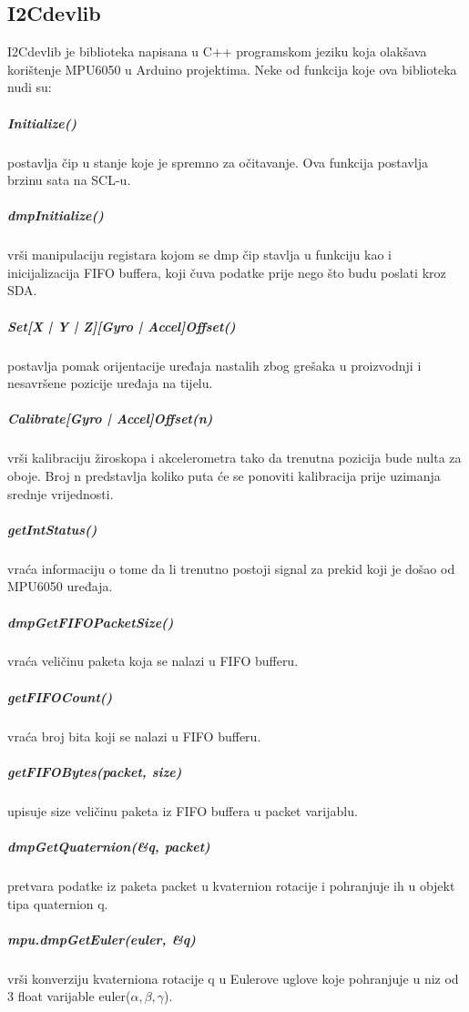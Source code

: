 \documentclass[../Document.tex]{subfiles}
\begin{document}

\subsection{I2Cdevlib} \label{itclib}
I2Cdevlib je biblioteka napisana u C++ programskom jeziku koja olakšava korištenje MPU6050 u Arduino projektima. Neke od funkcija koje ova biblioteka nudi su:

\subparagraph{Initialize()} \noindent postavlja čip u stanje koje je spremno za očitavanje. Ova funkcija postavlja brzinu sata na SCL-u.

\subparagraph{dmpInitialize()} \noindent vrši manipulaciju registara kojom se dmp čip stavlja u funkciju kao i inicijalizacija FIFO buffera, koji čuva podatke prije nego što budu poslati kroz SDA.

\subparagraph{Set[X | Y | Z][Gyro | Accel]Offset()} \noindent postavlja pomak orijentacije uređaja nastalih zbog grešaka u proizvodnji i nesavršene pozicije uređaja na tijelu.

\subparagraph{Calibrate[Gyro | Accel]Offset(n)} \noindent vrši kalibraciju žiroskopa i akcelerometra tako da trenutna pozicija bude nulta za oboje. Broj n predstavlja koliko puta će se ponoviti kalibracija prije uzimanja srednje vrijednosti.

\subparagraph{getIntStatus()} \noindent vraća informaciju o tome da li trenutno postoji signal za prekid koji je došao od MPU6050 uređaja.

\subparagraph{dmpGetFIFOPacketSize()} \noindent vraća veličinu paketa koja se nalazi u FIFO bufferu.

\subparagraph{getFIFOCount()} \noindent vraća broj bita koji se nalazi u FIFO bufferu.

\subparagraph{getFIFOBytes(packet, size)} \noindent upisuje size veličinu paketa iz FIFO buffera u packet varijablu.

\subparagraph{dmpGetQuaternion(\&q, packet)} \noindent pretvara podatke iz paketa packet u kvaternion rotacije i pohranjuje ih u objekt tipa quaternion q.

\subparagraph{mpu.dmpGetEuler(euler, \&q)} \noindent vrši konverziju kvaterniona rotacije q u Eulerove uglove koje pohranjuje u niz od 3 float varijable euler($\alpha,\beta,\gamma$).
\end{document}
